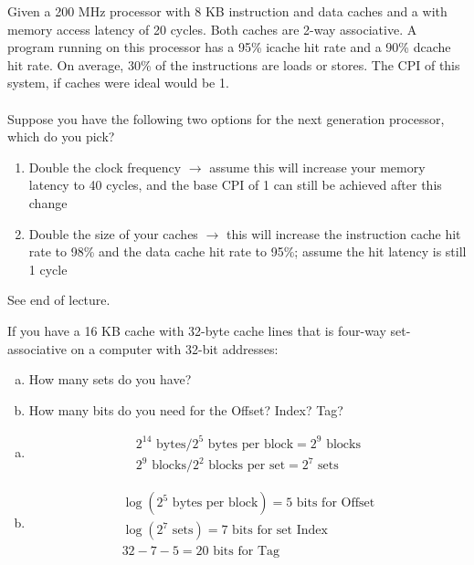 \begin{problem}
  Given a 200 MHz processor with 8 KB instruction and data caches and a with memory access latency of 20 cycles. Both caches are 2-way associative. A program running on this processor has a 95\% icache hit rate and a 90\% dcache hit rate. On average, 30\% of the instructions are loads or stores. The CPI of this system, if caches were ideal would be 1. \\
  \\
  Suppose you have the following two options for the next generation processor, which do you pick?
  \begin{enumerate}
    \item Double the clock frequency \(\to\) assume this will increase your memory latency to 40 cycles, and the base CPI of 1 can still be achieved after this change
    \item Double the size of your caches \(\to\) this will increase the instruction cache hit rate to 98\% and the data cache hit rate to 95\%; assume the hit latency is still 1 cycle
  \end{enumerate}
\end{problem}
\begin{answer}
  See end of lecture.
\end{answer}

\begin{problem}
  If you have a 16 KB cache with 32-byte cache lines that is four-way set-associative on a computer with 32-bit addresses:
  \begin{enumerate}[a.]
    \item How many sets do you have?
    \item How many bits do you need for the Offset? Index? Tag?
  \end{enumerate}
\end{problem}
\begin{answer} \;
  \begin{enumerate}[a.]
    \item
    \begin{align*}
      2^14 \text{ bytes} / 2^5 \text{ bytes per block} = 2^9 \text{ blocks} \\
      2^9 \text{ blocks} / 2^2 \text{ blocks per set} = 2^7 \text{ sets} 
    \end{align*}
    \item
    \begin{align*}
      \log (2^5 \text{ bytes per block}) = 5 \text{ bits for Offset} \\
      \log (2^7 \text{ sets}) = 7 \text{ bits for set Index} \\
      32 - 7 - 5 = 20 \text{ bits for Tag} 
    \end{align*}
  \end{enumerate}
\end{answer}

